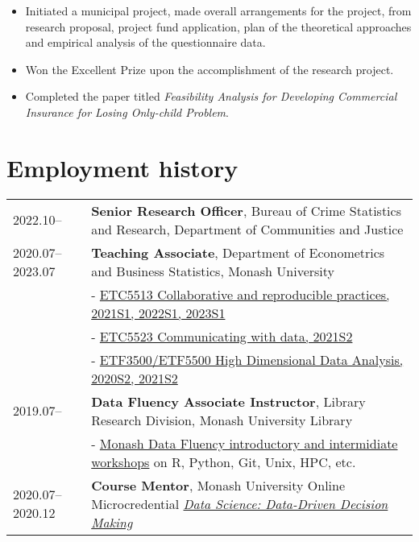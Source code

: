 \documentclass[10pt,a4paper,]{article}
\providecommand{\tightlist}{%
  \setlength{\itemsep}{0pt}\setlength{\parskip}{0pt}}
\begin{document}
\begin{itemize}
\tightlist
\item
  Initiated a municipal project, made overall arrangements for the
  project, from research proposal, project fund application, plan of the
  theoretical approaches and empirical analysis of the questionnaire
  data.
\item
  Won the Excellent Prize upon the accomplishment of the research
  project.
\item
  Completed the paper titled \emph{Feasibility Analysis for Developing
  Commercial Insurance for Losing Only-child Problem}.
\end{itemize}

\section{Employment history}\label{employment-history-1}

\begin{tabular}{ll}
  2022.10-- & \textbf{Senior Research Officer}, Bureau of Crime Statistics and Research, Department of Communities and Justice \\ 
  2020.07--2023.07 & \textbf{Teaching Associate}, Department of Econometrics and Business Statistics, Monash University \\ 
   & - \href{https://handbook.monash.edu/2021/units/ETC5513?year=2021}{ETC5513 Collaborative and reproducible practices, 2021S1, 2022S1, 2023S1} \\ 
   & - \href{https://handbook.monash.edu/2021/units/ETC5523?year=2021}{ETC5523 Communicating with data, 2021S2} \\ 
   & - \href{https://handbook.monash.edu/2020/units/ETF5500?year=2020}{ETF3500/ETF5500 High Dimensional Data Analysis, 2020S2, 2021S2} \\ 
  2019.07-- & \textbf{Data Fluency Associate Instructor}, Library Research Division, Monash University Library \\ 
   & - \href{https://www.monash.edu/data-fluency/home}{Monash Data Fluency introductory and intermidiate workshops} on R, Python, Git, Unix, HPC, etc. \\ 
  2020.07--2020.12 & \textbf{Course Mentor}, Monash University Online Microcredential \href{https://www.futurelearn.com/microcredentials/data-driven-decision-making?utm_source=faculty_website&utm_medium=monash_organic_referrer&utm_campaign=mc_jan}{\textit{Data Science: Data-Driven Decision Making}} \\ 
  \end{tabular}
\end{document}
